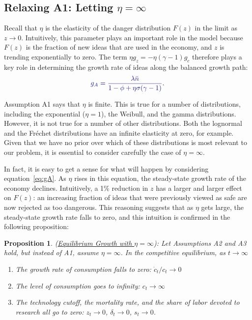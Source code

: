 \documentclass[12pt,twoside]{article}
\newcommand{\proptitle}[1]{\color{ChadBlue} \textnormal{(#1):}}
\newtheorem{proposition}{\color{ChadGreen} Proposition}
\newcommand{\clr}[1]{{\color{ChadBlue} #1}}
\begin{document}
\subsection{Relaxing A1: Letting $\eta=\infty$}

Recall that $\eta$ is the elasticity of the danger distribution $F(z)$
in the limit as $z \rightarrow 0$.  Intuitively, this parameter plays an
important role in the model because $F(z)$ is the fraction of new ideas
that are used in the economy, and $z$ is trending exponentially to zero.
The term $\eta g_z = -\eta (\gamma-1) g_c$ therefore plays a key role in
determining the growth rate of ideas along the balanced growth path:
\begin{equation}
\label{eq:gA}
\clr{ g_A = \frac{\lambda \bar{n}}{1-\phi+\eta \sigma (\gamma-1)} }.
\end{equation}

Assumption A1 says that $\eta$ is finite. This is true for a number of
distributions, including the exponential ($\eta=1$), the Weibull, and
the gamma distributions. However, it is not true for a number of other
distributions. Both the lognormal and the Fr\'{e}chet distributions have
an infinite elasticity at zero, for example. Given that we have no prior
over which of these distributions is most relevant to our problem, it is
essential to consider carefully the case of $\eta=\infty$.

In fact, it is easy to get a sense for what will happen by considering
equation~\eqref{eq:gA}. As $\eta$ rises in this equation, the
steady-state growth rate of the economy declines. Intuitively, a 1\%
reduction in $z$ has a larger and larger effect on $F(z)$: an increasing
fraction of ideas that were previously viewed as safe are now rejected
as too dangerous. This reasoning suggests that as $\eta$ gets large, the
steady-state growth rate falls to zero, and this intuition is confirmed
in the following proposition:

\begin{proposition}
\proptitle{\hyperlink{proof:eta}{Equilibrium Growth with $\eta=\infty$}}
\label{prop:eta} \hypertarget{prop:eta}{}
Let Assumptions A2 and A3 hold, but instead of A1, assume $\eta=\infty$.
In the competitive equilibrium, as $t \rightarrow \infty$
\begin{enumerate}
\item The growth rate of consumption falls to zero: $\dot{c}_t/c_t \rightarrow 0$
\item The level of consumption goes to infinity: $c_t \rightarrow \infty$
\item The technology cutoff, the mortality rate, and the share of labor
  devoted to research all go to zero: $z_t \rightarrow 0$, $\delta_t \rightarrow 0$, $s_t \rightarrow 0$.
\end{enumerate}
\end{proposition}
\end{document}
